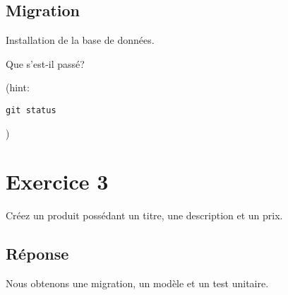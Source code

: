 \hypertarget{migration}{%
\subsection{Migration}\label{migration}}

Installation de la base de données.

\begin{otherlanguage}{english}

\begin{Shaded}
\begin{Highlighting}[]
\NormalTok{$ }
\end{Highlighting}
\end{Shaded}

\end{otherlanguage}

Que s'est-il passé?

(hint:
\begin{otherlanguage}{english}\texttt{git\ status}\end{otherlanguage})

\hypertarget{exercice-3}{%
\section{Exercice 3}\label{exercice-3}}

Créez un produit possédant un titre, une description et un prix.

\hypertarget{ruxe9ponse}{%
\subsection{Réponse}\label{ruxe9ponse}}

Nous obtenons une migration, un modèle et un test unitaire.

\begin{otherlanguage}{english}

\begin{Shaded}
\begin{Highlighting}[]
\NormalTok{$ }
\end{Highlighting}
\end{Shaded}

\end{otherlanguage}

